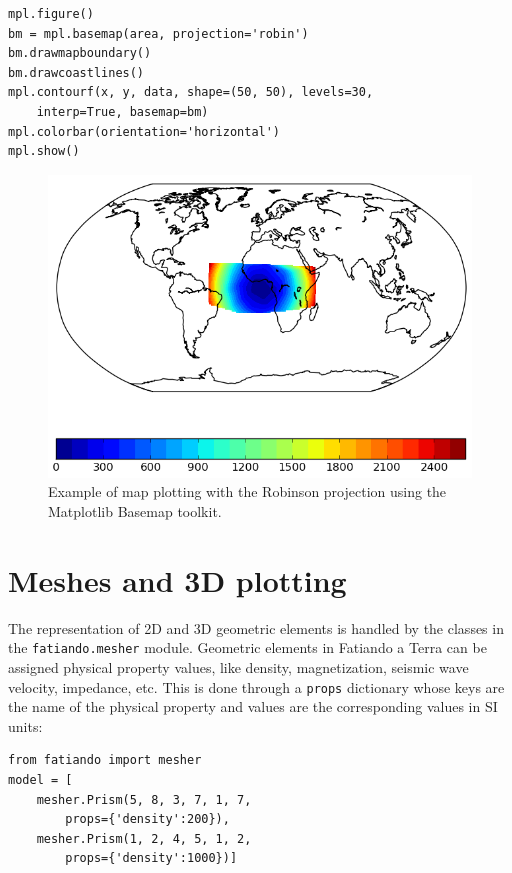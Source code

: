 \begin{verbatim}
mpl.figure()
bm = mpl.basemap(area, projection='robin')
bm.drawmapboundary()
bm.drawcoastlines()
mpl.contourf(x, y, data, shape=(50, 50), levels=30,
    interp=True, basemap=bm)
mpl.colorbar(orientation='horizontal')
mpl.show()
\end{verbatim}

\begin{figure}
    \centering
    \includegraphics[width=\textwidth]{figures/paper-fatiando/gridding_plotting_basemap}
    \caption{
        Example of map plotting with the Robinson projection using the
        Matplotlib Basemap toolkit.
    }
    \label{fig:p1-basemap}
\end{figure}



\section{Meshes and 3D plotting}

The representation of 2D and 3D geometric elements is handled by the
classes in the \texttt{fatiando.mesher} module. Geometric elements in
Fatiando a Terra can be assigned physical property values, like density,
magnetization, seismic wave velocity, impedance, etc. This is done
through a \texttt{props} dictionary whose keys are the name of the
physical property and values are the corresponding values in SI units:

\begin{verbatim}
from fatiando import mesher
model = [
    mesher.Prism(5, 8, 3, 7, 1, 7,
        props={'density':200}),
    mesher.Prism(1, 2, 4, 5, 1, 2,
        props={'density':1000})]
\end{verbatim}

